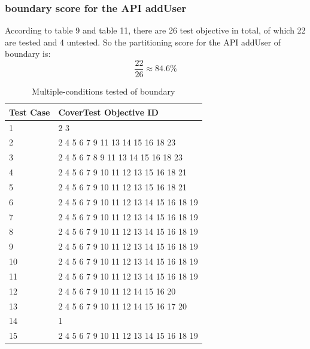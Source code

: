 \documentclass{article}
\begin{document}
\subsubsection{boundary score for the API addUser}
According to table 9 and table 11, there are 26 test objective in total, of which 22 are tested and 4 untested. So the partitioning score for the API addUser of boundary is:
$$\frac{22}{26}\approx84.6\%$$
\begin{longtable}{|p{2cm}|p{8cm}|}
\caption{Multiple-conditions tested of boundary}\\
\hline 
Test Case& CoverTest Objective ID\\
\hline  
1&2 3\\
\hline
2&2 4 5 6 7 9 11 13 14 15 16 18 23\\
\hline
3&2 4 5 6 7 8 9 11 13 14 15 16 18 23\\
\hline
4&2 4 5 6 7 9 10 11 12 13 15 16 18 21\\
\hline
5&2 4 5 6 7 9 10 11 12 13 15 16 18 21\\
\hline
6&2 4 5 6 7 9 10 11 12 13 14 15 16 18 19\\
\hline
7&2 4 5 6 7 9 10 11 12 13 14 15 16 18 19\\
\hline
8&2 4 5 6 7 9 10 11 12 13 14 15 16 18 19\\
\hline
9&2 4 5 6 7 9 10 11 12 13 14 15 16 18 19\\
\hline
10&2 4 5 6 7 9 10 11 12 13 14 15 16 18 19\\
\hline
11&2 4 5 6 7 9 10 11 12 13 14 15 16 18 19\\
\hline
12&2 4 5 6 7 9 10 11 12 14 15 16 20\\
\hline
13&2 4 5 6 7 9 10 11 12 14 15 16 17 20\\
\hline
14&1\\
\hline
15&2 4 5 6 7 9 10 11 12 13 14 15 16 18 19\\
\hline
\end{longtable}

\end{document}

